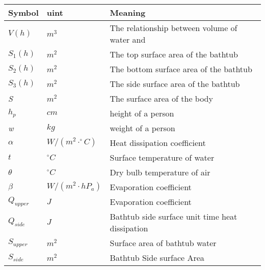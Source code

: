 \documentclass{mcmthesis}
\begin{document}
\begin{table}[H]
        \setlength{\abovecaptionskip}{0pt}
        \setlength{\belowcaptionskip}{0pt}
         \\
        \begin{tabular}{p{1.8cm}|p{2.2cm}|p{9cm}}
        \hline
        \rowcolor[gray]{0.9}\bf{Symbol}	&\bf{uint}      &\bf{Meaning}\\
        \hline
        $V(h)$			& $m^3  $		 & The relationship between volume of water and  \\
        $S_{1}(h)$		& $m^2  $		 & The top surface area of the bathtub 	\\
        $S_{2}(h)$		& $m^2  $		 & The bottom surface area of the bathtub 	\\
        $S_{3}(h)$		& $m^2  $		 & The side surface area of the bathtub 	\\
        \emph{S}	& $m^2  $		 & The surface area of the body\\
        ${h_{p}}$	& $cm	$        & height of a person \\
        \emph{w}	& $kg	$        & weight of a person \\
        $\alpha$		& $ W/(m^{2}\cdot^{\circ}C)  $		 & Heat dissipation coefficient\\
        $t$		& $ ^{\circ}C  $		 & Surface temperature of water \\
        $\theta$		& $^{\circ}C$		 & Dry bulb temperature of air\\
        $\beta$		& $W/(m^{2}\cdot hP_{a})$		 & Evaporation coefficient\\
        $Q_{upper}$		& $J$		 & Evaporation coefficient\\
		$Q_{side}$		& $J$		 & Bathtub side surface unit time heat dissipation\\
		$S_{upper}$		& $m^2$		 & Surface area of bathtub water\\
		$S_{side}$		& $m^2$		 & Bathtub Side surface Area\\

        \hline
        \end{tabular}
        \end{table}

\end{document}
